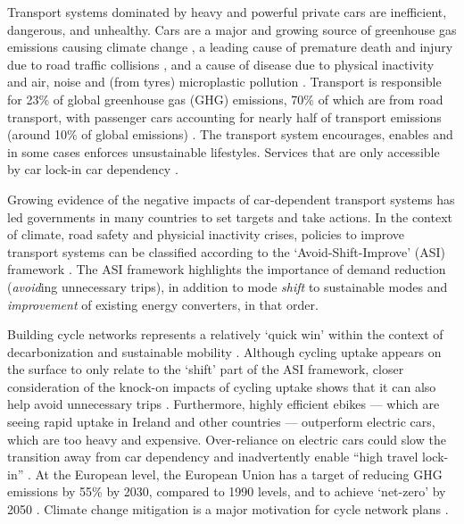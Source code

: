 \documentclass[
  super,
  preprint,
  3p]{elsarticle}
\begin{document}
Transport systems dominated by heavy and powerful private cars are
inefficient, dangerous, and unhealthy. Cars are a major and growing
source of greenhouse gas emissions causing climate change
\citep{winkler2023}, a leading cause of premature death and injury due
to road traffic collisions \citep{globals2018} , and a cause of disease
due to physical inactivity and air, noise and (from tyres) microplastic
pollution \citep{mattsson2023} \citep{welch2023} \citep{cavallaro2024}.
Transport is responsible for 23\% of global greenhouse gas (GHG)
emissions, 70\% of which are from road transport, with passenger cars
accounting for nearly half of transport emissions (around 10\% of global
emissions) \citep{jaramillo2022}. The transport system encourages,
enables and in some cases enforces unsustainable lifestyles. Services
that are only accessible by car lock-in car dependency
\citep{gray2001, shergold2012, motte-baumvol2010}.

Growing evidence of the negative impacts of car-dependent transport
systems has led governments in many countries to set targets and take
actions. In the context of climate, road safety and physicial inactivity
crises, policies to improve transport systems can be classified
according to the `Avoid-Shift-Improve' (ASI) framework
\citep{jaramillo2022}. The ASI framework highlights the importance of
demand reduction (\emph{avoid}ing unnecessary trips), in addition to
mode \emph{shift} to sustainable modes and \emph{improvement} of
existing energy converters, in that order.

Building cycle networks represents a relatively `quick win' within the
context of decarbonization \citep{brand2020} and sustainable mobility
\citep{burns2013}. Although cycling uptake appears on the surface to
only relate to the `shift' part of the ASI framework, closer
consideration of the knock-on impacts of cycling uptake shows that it
can also help avoid unnecessary trips \citep{nello-deakin2020}.
Furthermore, highly efficient ebikes --- which are seeing rapid uptake
in Ireland and other countries --- outperform electric cars, which are
too heavy and expensive. Over-reliance on electric cars could slow the
transition away from car dependency and inadvertently enable ``high
travel lock-in'' \citep{anable2019}. At the European level, the European
Union has a target of reducing GHG emissions by 55\% by 2030, compared
to 1990 levels, and to achieve `net-zero' by 2050 \citep{rosenow2022}.
Climate change mitigation is a major motivation for cycle network plans
\citep{scappini2022}.
\end{document}
